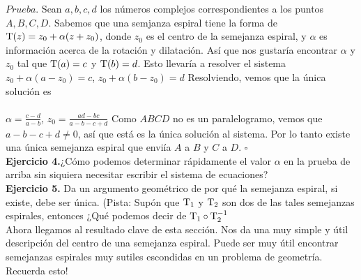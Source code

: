 \documentclass[11pt, a4paper]{article}
\begin{document}
$Prueba$. Sean $a,b,c,d$ los n\'umeros complejos correspondientes a los puntos $A,B,C,D$. Sabemos que una semjanza espiral tiene la forma de $\mathrm{T} (z) = z_0 + \alpha(z + z_0) $, donde $z_0$ es el centro de la semejanza espiral, y $\alpha$ es informaci\'on acerca de la rotaci\'on y dilataci\'on. As\'i que nos gustar\'ia encontrar $\alpha$ y $z_0$ tal que $\mathrm{T} (a) = c$ y $\mathrm{T} (b) = d$. Esto llevar\'ia a resolver el sistema \\


\hfil $z_0 + \alpha (a - z_0) = c$, \hfil  $z_0 + \alpha (b - z_0) = d$
\newpage
Resolviendo, vemos que la \'unica soluci\'on es \\\\
\hfil $\alpha = \frac{c-d}{a-b}$, \hfil $z_0 = \frac{ad - bc}{a-b-c+d}$
Como $ABCD$ no es un paralelogramo, vemos que $a-b-c+d \ne 0$, as\'i que est\'a es la \'unica soluci\'on al sistema. Por lo tanto existe una \'unica semejanza espiral que envi\'ia $A$ a $B$ y $C$ a $D$. \hfill $\square$ \\

\textbf{Ejercicio 4.}¿C\'omo podemos determinar r\'apidamente el valor $\alpha$ en la prueba de arriba sin siquiera necesitar escribir el sistema de ecuaciones?\\

\textbf{Ejercicio 5.} Da un argumento geom\'etrico de por qu\'e la semejanza espiral, si existe, debe ser \'unica. (Pista: Sup\'on que $\mathrm{T}_1$ y $\mathrm{T}_2$ son dos de las tales semejanzas espirales, entonces  ¿Qu\'e podemos decir de $\mathrm{T}_1 \circ \mathrm{T}_2^{-1}$\\

Ahora llegamos al resultado clave de esta secci\'on. Nos da una muy simple y \'util descripci\'on del centro de una semejanza espiral. Puede ser muy \'util encontrar semejanzas espirales muy sutiles escondidas en un problema de geometr\'ia. Recuerda esto!
\\
\end{document}
